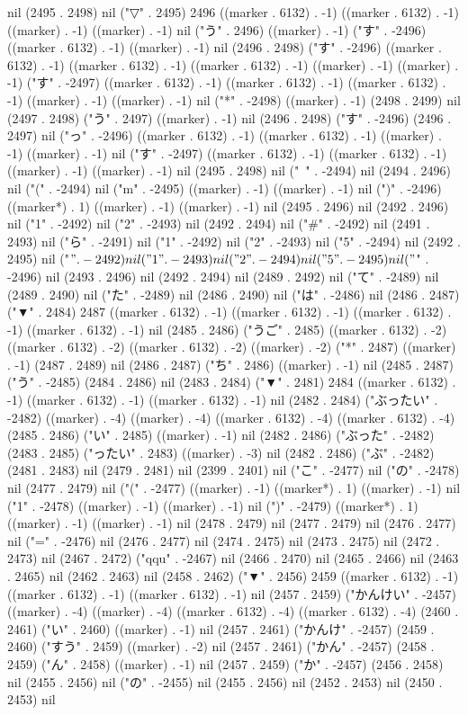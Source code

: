 nil (2495 . 2498) nil ("▽" . 2495) 2496 ((marker . 6132) . -1) ((marker . 6132) . -1) ((marker) . -1) ((marker) . -1) nil ("う" . 2496) ((marker) . -1) ("す" . -2496) ((marker . 6132) . -1) ((marker) . -1) nil (2496 . 2498) ("す" . -2496) ((marker . 6132) . -1) ((marker . 6132) . -1) ((marker . 6132) . -1) ((marker) . -1) ((marker) . -1) ("す" . -2497) ((marker . 6132) . -1) ((marker . 6132) . -1) ((marker . 6132) . -1) ((marker) . -1) ((marker) . -1) nil ("*" . -2498) ((marker) . -1) (2498 . 2499) nil (2497 . 2498) ("う" . 2497) ((marker) . -1) nil (2496 . 2498) ("す" . -2496) (2496 . 2497) nil ("っ" . -2496) ((marker . 6132) . -1) ((marker . 6132) . -1) ((marker) . -1) ((marker) . -1) nil ("す" . -2497) ((marker . 6132) . -1) ((marker . 6132) . -1) ((marker) . -1) ((marker) . -1) nil (2495 . 2498) nil ("~" . -2494) nil (2494 . 2496) nil ("(" . -2494) nil ("m" . -2495) ((marker) . -1) ((marker) . -1) nil (")" . -2496) ((marker*) . 1) ((marker) . -1) ((marker) . -1) nil (2495 . 2496) nil (2492 . 2496) nil ("1" . -2492) nil ("2" . -2493) nil (2492 . 2494) nil ("#" . -2492) nil (2491 . 2493) nil ("ら" . -2491) nil ("1" . -2492) nil ("2" . -2493) nil ("5" . -2494) nil (2492 . 2495) nil ("$" . -2492) nil ("1" . -2493) nil ("2" . -2494) nil ("5" . -2495) nil ("$" . -2496) nil (2493 . 2496) nil (2492 . 2494) nil (2489 . 2492) nil ("て" . -2489) nil (2489 . 2490) nil ("た" . -2489) nil (2486 . 2490) nil ("は" . -2486) nil (2486 . 2487) ("▼" . 2484) 2487 ((marker . 6132) . -1) ((marker . 6132) . -1) ((marker . 6132) . -1) ((marker . 6132) . -1) nil (2485 . 2486) ("うご" . 2485) ((marker . 6132) . -2) ((marker . 6132) . -2) ((marker . 6132) . -2) ((marker) . -2) ("*" . 2487) ((marker) . -1) (2487 . 2489) nil (2486 . 2487) ("ち" . 2486) ((marker) . -1) nil (2485 . 2487) ("う" . -2485) (2484 . 2486) nil (2483 . 2484) ("▼" . 2481) 2484 ((marker . 6132) . -1) ((marker . 6132) . -1) ((marker . 6132) . -1) nil (2482 . 2484) ("ぶったい" . -2482) ((marker) . -4) ((marker) . -4) ((marker . 6132) . -4) ((marker . 6132) . -4) (2485 . 2486) ("い" . 2485) ((marker) . -1) nil (2482 . 2486) ("ぶった" . -2482) (2483 . 2485) ("ったい" . 2483) ((marker) . -3) nil (2482 . 2486) ("ぶ" . -2482) (2481 . 2483) nil (2479 . 2481) nil (2399 . 2401) nil ("こ" . -2477) nil ("の" . -2478) nil (2477 . 2479) nil ("(" . -2477) ((marker) . -1) ((marker*) . 1) ((marker) . -1) nil ("1" . -2478) ((marker) . -1) ((marker) . -1) nil (")" . -2479) ((marker*) . 1) ((marker) . -1) ((marker) . -1) nil (2478 . 2479) nil (2477 . 2479) nil (2476 . 2477) nil ("=" . -2476) nil (2476 . 2477) nil (2474 . 2475) nil (2473 . 2475) nil (2472 . 2473) nil (2467 . 2472) ("qqu" . -2467) nil (2466 . 2470) nil (2465 . 2466) nil (2463 . 2465) nil (2462 . 2463) nil (2458 . 2462) ("▼" . 2456) 2459 ((marker . 6132) . -1) ((marker . 6132) . -1) ((marker . 6132) . -1) nil (2457 . 2459) ("かんけい" . -2457) ((marker) . -4) ((marker) . -4) ((marker . 6132) . -4) ((marker . 6132) . -4) (2460 . 2461) ("い" . 2460) ((marker) . -1) nil (2457 . 2461) ("かんけ" . -2457) (2459 . 2460) ("すう" . 2459) ((marker) . -2) nil (2457 . 2461) ("かん" . -2457) (2458 . 2459) ("ん" . 2458) ((marker) . -1) nil (2457 . 2459) ("か" . -2457) (2456 . 2458) nil (2455 . 2456) nil ("の" . -2455) nil (2455 . 2456) nil (2452 . 2453) nil (2450 . 2453) nil 